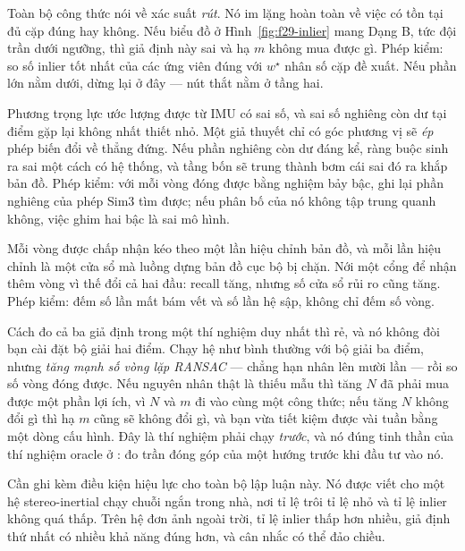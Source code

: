 \documentclass[../../deep_learning.tex]{subfiles}
\begin{document}
\begin{mach}
\item {}
      \gd Toàn bộ công thức nói về xác suất \emph{rút}. Nó im lặng hoàn toàn về việc có tồn tại đủ cặp đúng hay không.
      \hq Nếu biểu đồ ở Hình~\ref{fig:f29-inlier} mang Dạng B, tức đội trần dưới ngưỡng, thì giả định này sai và hạ \(m\) không mua được gì. Phép kiểm: so số inlier tốt nhất của các ứng viên đúng với \(w^\star\) nhân số cặp đề xuất. Nếu phần lớn nằm dưới, dừng lại ở đây --- nút thắt nằm ở tầng hai.
\item {}
      \gd Phương trọng lực ước lượng được từ IMU có sai số, và sai số nghiêng còn dư tại điểm gặp lại không nhất thiết nhỏ.
      \hq Một giả thuyết chỉ có góc phương vị sẽ \emph{ép} phép biến đổi về thẳng đứng. Nếu phần nghiêng còn dư đáng kể, ràng buộc sinh ra sai một cách có hệ thống, và tầng bốn sẽ trung thành bơm cái sai đó ra khắp bản đồ. Phép kiểm: với mỗi vòng đóng được bằng nghiệm bảy bậc, ghi lại phần nghiêng của phép Sim3 tìm được; nếu phân bố của nó không tập trung quanh không, việc ghim hai bậc là sai mô hình.
\item {}
      \gd Mỗi vòng được chấp nhận kéo theo một lần hiệu chỉnh bản đồ, và mỗi lần hiệu chỉnh là một cửa sổ mà luồng dựng bản đồ cục bộ bị chặn.
      \hq Nới một cổng để nhận thêm vòng vì thế đổi cả hai đầu: recall tăng, nhưng số cửa sổ rủi ro cũng tăng. Phép kiểm: đếm số lần mất bám vết và số lần hệ sập, không chỉ đếm số vòng.
\end{mach}

Cách đo cả ba giả định trong một thí nghiệm duy nhất thì rẻ, và nó không đòi bạn cài đặt bộ giải hai điểm. Chạy hệ như bình thường với bộ giải ba điểm, nhưng \emph{tăng mạnh số vòng lặp RANSAC} --- chẳng hạn nhân lên mười lần --- rồi so số vòng đóng được. Nếu nguyên nhân thật là thiếu mẫu thì tăng \(N\) đã phải mua được một phần lợi ích, vì \(N\) và \(m\) đi vào cùng một công thức; nếu tăng \(N\) không đổi gì thì hạ \(m\) cũng sẽ không đổi gì, và bạn vừa tiết kiệm được vài tuần bằng một dòng cấu hình. Đây là thí nghiệm phải chạy \emph{trước}, và nó đúng tinh thần của thí nghiệm oracle ở : đo trần đóng góp của một hướng trước khi đầu tư vào nó.

Cần ghi kèm điều kiện hiệu lực cho toàn bộ lập luận này. Nó được viết cho một hệ stereo-inertial chạy chuỗi ngắn trong nhà, nơi tỉ lệ trôi tỉ lệ nhỏ và tỉ lệ inlier không quá thấp. Trên hệ đơn ảnh ngoài trời, tỉ lệ inlier thấp hơn nhiều, giả định thứ nhất có nhiều khả năng đúng hơn, và cân nhắc có thể đảo chiều.
\end{document}
